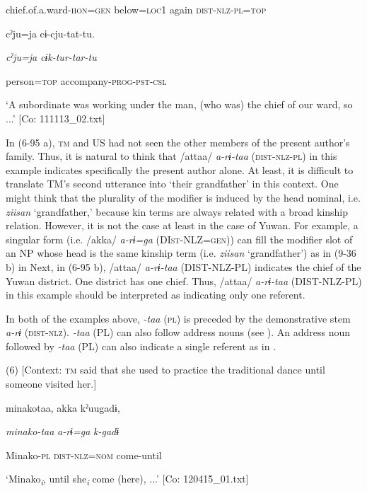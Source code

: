       chief.of.a.ward-\textsc{hon}=\textsc{gen}  below=\textsc{loc}1  again  \textsc{dist}-\textsc{nlz}-\textsc{pl}=\textsc{top}

      cˀju=ja  cɨ-cju-tat-tu.

      \textit{cˀju=ja}  \textit{cɨk-tur-tar-tu}

      person=\textsc{top}  accompany-\textsc{prog}-\textsc{pst}-\textsc{csl}

\glt ‘A subordinate was working under the man, (who was) the chief of our ward, so ...’ [Co: 111113\_02.txt]
\z

In (6-95 a), \textsc{tm} and US had not seen the other members of the present author’s family. Thus, it is natural to think that /attaa/ \textit{a-rɨ-taa} (\textsc{dist}-\textsc{nlz}-\textsc{pl}) in this example indicates specifically the present author alone. At least, it is difficult to translate TM’s second utterance into ‘their grandfather’ in this context. One might think that the plurality of the modifier is induced by the head nominal, i.e. \textit{ziisan} ‘grandfather,’ because kin terms are always related with a broad kinship relation. However, it is not the case at least in the case of Yuwan. For example, a singular form (i.e. /akka/ \textit{a-rɨ=ga} (DI\textsc{st}-NLZ=\textsc{gen})) can fill the modifier slot of an NP whose head is the same kinship term (i.e. \textit{ziisan} ‘grandfather’) as in (9-36 b) in  Next, in (6-95 b), /attaa/ \textit{a-rɨ-taa} (DIST-NLZ-PL) indicates the chief of the Yuwan district. One district has one chief. Thus, /attaa/ \textit{a-rɨ-taa} (DIST-NLZ-PL) in this example should be interpreted as indicating only one referent.

In both of the examples above, \textit{{}-taa} (\textsc{pl}) is preceded by the demonstrative stem \textit{a-rɨ} (\textsc{dist}-\textsc{nlz}). \textit{{}-taa} (PL) can also follow address nouns (see ). An address noun followed by \textit{{}-taa} (PL) can also indicate a single referent as in .

(6)  [Context: \textsc{tm} said that she used to practice the traditional dance until someone visited her.]

{\TM}
\gll minakotaa,  akka  kˀuugadɨ,

    \textit{minako-taa}  \textit{a-rɨ=ga}  \textit{k-gadɨ}

    Minako-\textsc{pl}  \textsc{dist}-\textsc{nlz}=\textsc{nom}  come-until

\glt    ‘Minako\textit{\textsubscript{i}}, until she\textit{\textsubscript{i}} come (here), ...’ [Co: 120415\_01.txt]
\z

